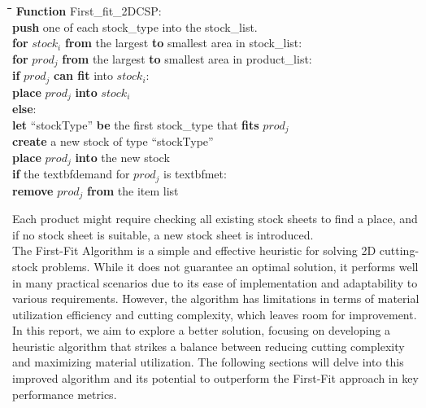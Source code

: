 \documentclass[a4paper]{article}
\begin{document}
    \pagebreak
    \label{sec:first-fit}
    \begin{mdframed}[backgroundcolor=black!10]
        \begin{tabbing}
    \hspace{0.5cm}\=\hspace{0.5cm}\=\hspace{0.5cm}\=\hspace{0.5cm}\=\hspace{0.5cm}\=\kill
        \textbf{Function} First\_fit\_2DCSP: \\    
        \> \textbf{push} one of each stock\_type into the stock\_list.\\
        \> \textbf{for} $stock_i$ \textbf{from} the largest \textbf{to} smallest area in stock\_list:\\
        \>\> \textbf{for} $prod_j$ \textbf{from} the largest \textbf{to} smallest area in product\_list:\\
        \>\>\> \textbf{if} $prod_j$ \textbf{can fit} into $stock_i$:\\
        \>\>\>\> \textbf{place} $prod_j$ \textbf{into} $stock_i$\\
        \>\>\> \textbf{else}:\\
        \>\>\>\> \textbf{let} ``stockType'' \textbf{be} the first stock\_type that \textbf{fits} $prod_j$\\
        \>\>\>\> \textbf{create} a new stock of type ``stockType''\\
        \>\>\>\> \textbf{place} $prod_j$ \textbf{into} the new stock\\
        \>\>\> \textbf{if} the textbf{demand} for $prod_j$ is textbf{met}:\\
        \>\>\>\> \textbf{remove} $prod_j$ \textbf{from} the item list
        \end{tabbing}
    \end{mdframed}
    
    \vspace{0.2cm}
    Each product might require checking all existing stock sheets to find a place, and if no stock sheet is suitable, a new stock sheet is introduced.
    \vspace{0.2cm}\\
    The First-Fit Algorithm is a simple and effective heuristic for solving 2D cutting-stock problems. While it does not guarantee an optimal solution, it performs well in many practical scenarios due to its ease of implementation and adaptability to various requirements. However, the algorithm has limitations in terms of material utilization efficiency and cutting complexity, which leaves room for improvement.
    \vspace{0.2cm}\\
    In this report, we aim to explore a better solution, focusing on developing a heuristic algorithm that strikes a balance between reducing cutting complexity and maximizing material utilization. The following sections will delve into this improved algorithm and its potential to outperform the First-Fit approach in key performance metrics.
    
\end{document}
